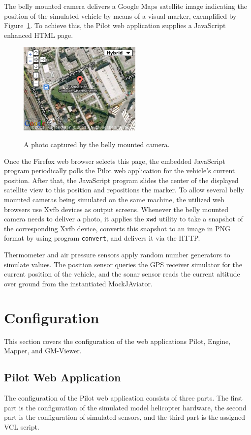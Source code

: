 The belly mounted camera delivers a Google Maps satellite image indicating the position of the simulated vehicle by
means of a visual marker, exemplified by Figure~\ref{fig:BellyMountedCamera}.
To achieve this, the Pilot web application supplies a JavaScript enhanced HTML page.
\begin{figure}[h]
	\begin{center}
		{\includegraphics[width=6cm]{bmc-photo-cosy.png}}
	\end{center}
	\caption{A photo captured by the belly mounted camera.\label{fig:BellyMountedCamera}}
\end{figure}

Once the Firefox web browser selects this page, the embedded JavaScript program periodically polls the Pilot web
application for the vehicle's current position. After that, the JavaScript program slides the center of the
displayed satellite view to this position and repositions the marker.
To allow several belly mounted cameras being simulated on the same machine, the utilized web browsers use \ac{Xvfb}
devices as output screens.
%
Whenever the belly mounted camera needs to deliver a photo, it applies the \texttt{xwd} utility to take a snapshot
of the corresponding \ac{Xvfb} device, converts this snapshot to an image in PNG format by using program
\texttt{convert}, and delivers it via the \ac{HTTP}.

Thermometer and air pressure sensors apply random number generators to simulate values.
The position sensor queries the GPS receiver simulator for the current position of the vehicle, and the sonar
sensor reads the current altitude over ground from the instantiated MockJAviator.

\section{Configuration}
This section covers the configuration of the web applications Pilot, Engine, Mapper, and GM-Viewer.

\subsection{Pilot Web Application}
The configuration of the Pilot web application consists of three parts. The first part is the configuration of the
simulated model helicopter hardware, the second part is the configuration of simulated sensors, and the third
part is the assigned \ac{VCL} script.

